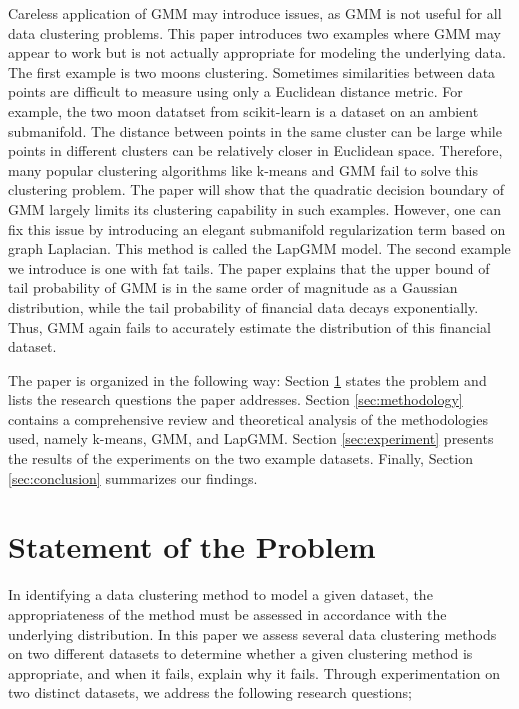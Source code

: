 \documentclass[10pt,journal,compsoc]{IEEEtran}
\begin{document}
Careless application of GMM may introduce issues, as GMM is not useful for all data clustering problems. This paper introduces two examples where GMM may appear to work but is not actually appropriate for modeling the underlying data. The first example is two moons clustering. Sometimes similarities between data points are difficult to measure using only a Euclidean distance metric. For example, the two moon datatset from scikit-learn\cite{scikit-learn} is a dataset on an ambient submanifold. The distance between points in the same cluster can be large while points in different clusters can be relatively closer in Euclidean space. Therefore, many popular clustering algorithms like k-means and GMM fail to solve this clustering problem. The paper will show that the quadratic decision boundary of GMM largely limits its clustering capability in such examples. However, one can fix this issue by introducing an elegant submanifold regularization term based on graph Laplacian. This method is called the LapGMM model\cite{he2010laplacian}. The second example we introduce is one with fat tails. The paper explains that the upper bound of tail probability of GMM is in the same order of magnitude as a Gaussian distribution, while the tail probability of financial data decays exponentially. Thus, GMM again fails to accurately estimate the distribution of this financial dataset.

The paper is organized in the following way: Section \ref{sec:statement-of-problem} states the problem and lists the research questions the paper addresses. Section \ref{sec:methodology} contains a comprehensive review and theoretical analysis of the methodologies used, namely k-means, GMM, and LapGMM. Section \ref{sec:experiment} presents the results of the experiments on the two example datasets. Finally, Section \ref{sec:conclusion} summarizes our findings.

\section{Statement of the Problem}\label{sec:statement-of-problem}

In identifying a data clustering method to model a given dataset, the appropriateness of the method must be assessed in accordance with the underlying distribution. In this paper we assess several data clustering methods on two different datasets to determine whether a given clustering method is appropriate, and when it fails, explain why it fails. Through experimentation on two distinct datasets, we address the following research questions;
\end{document}
